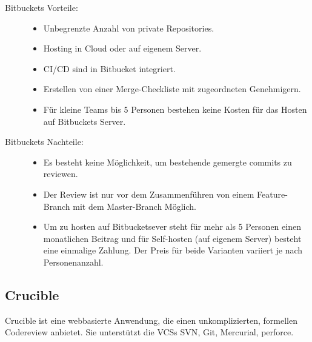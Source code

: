 \begin{description}
	\item [Bitbuckets Vorteile:] \hfill
	\begin{itemize}
		\item Unbegrenzte Anzahl von private Repositories.
		\item Hosting in Cloud oder auf eigenem Server.
		\item \ac{CI}/\ac{CD} sind in Bitbucket integriert.
		\item Erstellen von einer Merge-Checkliste mit zugeordneten Genehmigern.
		\item Für kleine Teams bis 5 Personen bestehen keine Kosten für das Hosten auf Bitbuckets Server.
	\end{itemize}
	
	\item [Bitbuckets Nachteile:] \hfill
	\begin{itemize}
		\item Es besteht keine Möglichkeit, um bestehende gemergte commits zu reviewen.
		\item Der Review ist nur vor dem Zusammenführen von einem Feature-Branch mit dem Master-Branch Möglich.
		\item Um zu hosten auf Bitbucketsever steht für mehr als 5 Personen einen monatlichen Beitrag und für Self-hosten (auf eigenem Server) besteht eine einmalige Zahlung. Der 
			Preis für beide Varianten variiert je nach Personenanzahl.
	\end{itemize}
\end{description}

\subsection{Crucible}
\label{subsec:Crucible}

Crucible ist eine webbasierte Anwendung, die einen unkomplizierten, formellen Codereview anbietet. Sie unterstützt die \acp{VCS} \ac{SVN}, Git, Mercurial, perforce.

